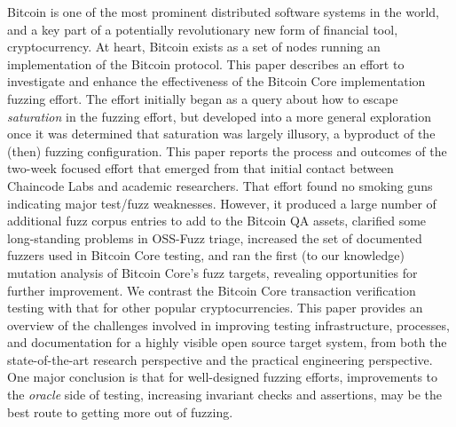 Bitcoin is one of the most prominent distributed software systems in the world, and a key part of a potentially revolutionary new form of financial tool, cryptocurrency.  At heart, Bitcoin exists as a set of nodes running an implementation of the Bitcoin protocol.  This paper describes an effort to investigate and enhance the effectiveness of the Bitcoin Core implementation fuzzing effort.  The effort initially began as a query about how to escape \emph{saturation} in the fuzzing effort, but developed into a more general exploration once it was determined that saturation was largely illusory, a byproduct of the (then) fuzzing configuration.  This paper reports the process and outcomes of the two-week focused effort that emerged from that initial contact between Chaincode Labs and academic researchers.  That effort found no smoking guns indicating major test/fuzz weaknesses. However, it produced a large number of additional fuzz corpus entries to add to the Bitcoin QA assets, clarified some long-standing problems in OSS-Fuzz triage, increased the set of documented fuzzers used in Bitcoin Core testing, and ran the first (to our knowledge) mutation analysis of Bitcoin Core's fuzz targets, revealing opportunities for further improvement.  We contrast the Bitcoin Core transaction verification testing with that for other popular cryptocurrencies.  This paper provides an overview of the challenges involved in improving testing infrastructure, processes, and documentation for a highly visible open source target system, from both the state-of-the-art research perspective and the practical engineering perspective.  One major conclusion is that for well-designed fuzzing efforts, improvements to the \emph{oracle} side of testing, increasing invariant checks and assertions, may be the best route to getting more out of fuzzing.